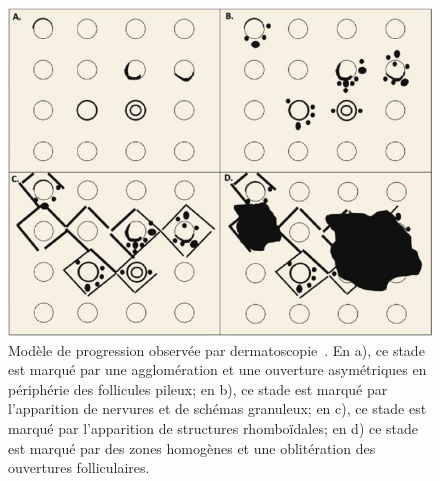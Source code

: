 \begin{figure}[H]
    \centering
    \includegraphics[width=0.8\linewidth]{contents/chapter_1/resources/illustration_surface_progression.jpg}
    \caption{Modèle de progression observée par dermatoscopie~\cite{Navarrete-Dechent2020}. En a), ce stade est marqué par une agglomération et une ouverture asymétriques en périphérie des follicules pileux; en b), ce stade est marqué par l'apparition de nervures et de schémas granuleux; en c), ce stade est marqué par l'apparition de structures rhomboïdales; en d) ce stade est marqué par des zones homogènes et une oblitération des ouvertures folliculaires.}
    \label{fig:illustration_surface_progression}
\end{figure}\par

